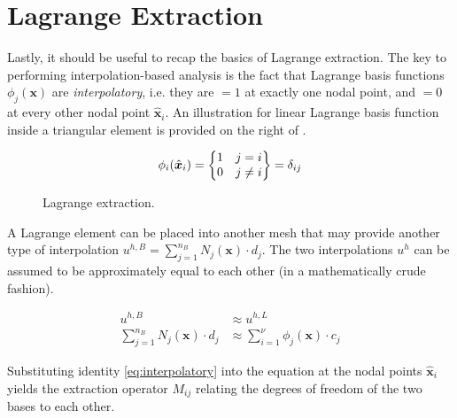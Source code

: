 \newpage
\section{Lagrange Extraction}
\label{sec:overview_extraction}

Lastly, it should be useful to recap the basics of Lagrange extraction. 
The key to performing interpolation-based analysis is the fact that Lagrange basis functions $\phi_j(\bm{x})$ are \emph{interpolatory}, i.e. they are $=1$ at exactly one nodal point, and $=0$ at every other nodal point $\hat{\bm{x}}_i$. An illustration for linear Lagrange basis function inside a triangular element is provided on the right of .

\begin{equation}
\label{eq:interpolatory}
    \phi_i(\hat{\bm{x}}_i) =
    \left\{
    \begin{array}{@{}c@{}}
        1 ~~~ j=i \\
        0 ~~~ j \neq i
    \end{array} 
    \right\} 
    = \delta_{ij}
\end{equation}
    
\begin{figure}[h]
    \vspace{0.2cm}
    \begin{center}
    
    \caption{Lagrange extraction.} 
    \label{fig:lagrange_extraction}
    \end{center}
\end{figure}

A Lagrange element can be placed into another mesh that may provide another type of interpolation $u^{h,B} = \sum_{j=1}^{n_B} N_j(\bm{x}) \cdot d_j$. The two interpolations $u^{h}$ can be assumed to be approximately equal to each other (in a mathematically crude fashion).

\begin{equation}
\label{eq:approx}
\begin{split}
    u^{h,B} 
    &\approx u^{h,L} \\
    \sum_{j=1}^{n_B} N_j(\bm{x}) \cdot d_j 
    &\approx \sum_{i=1}^{\nu} \phi_j(\bm{x}) \cdot c_j
\end{split}
\end{equation}

Substituting identity \eqref{eq:interpolatory} into the equation at the nodal points $\hat{\bm{x}}_i$ yields the extraction operator $M_{ij}$ relating the degrees of freedom of the two bases to each other.

